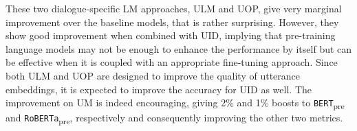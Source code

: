 \documentclass[11pt,a4paper]{article}
\begin{document}
\begin{table}[htp!]
\centering{}
\caption{Results for the ablation studies. Note that the \texttt{*}\textsubscript{uid}\textsc{ulm}\textsc{uop} models are equivalent to the \texttt{*}\textsubscript{our} models in Table~\ref{tab:result}, respectively.}
\label{tab:ablation}
\end{table}

\noindent These two dialogue-specific LM approaches, ULM and UOP, give very marginal improvement over the baseline models, that is rather surprising.
However, they show good improvement when combined with UID, implying that pre-training language models may not be enough to enhance the performance by itself but can be effective when it is coupled with an appropriate fine-tuning approach.
Since both ULM and UOP are designed to improve the quality of utterance embeddings, it is expected to improve the accuracy for UID as well. The improvement on UM is indeed encouraging, giving 2\% and 1\% boosts to \texttt{BERT}\textsubscript{pre} and \texttt{RoBERTa}\textsubscript{pre}, respectively and consequently improving the other two metrics.
\end{document}
